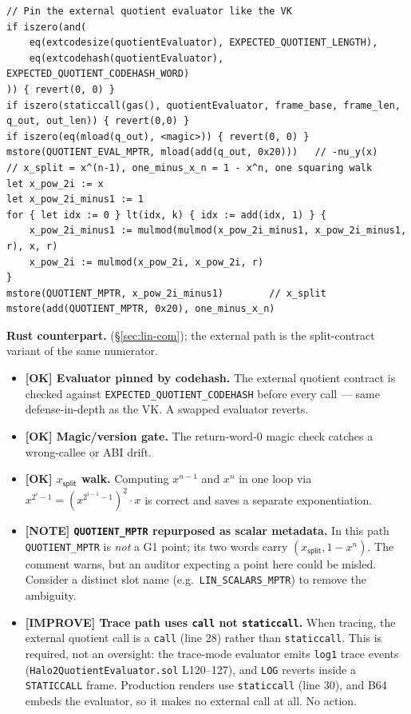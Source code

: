 \begin{lstlisting}[style=yul]
// Pin the external quotient evaluator like the VK
if iszero(and(
    eq(extcodesize(quotientEvaluator), EXPECTED_QUOTIENT_LENGTH),
    eq(extcodehash(quotientEvaluator), EXPECTED_QUOTIENT_CODEHASH_WORD)
)) { revert(0, 0) }
if iszero(staticcall(gas(), quotientEvaluator, frame_base, frame_len, q_out, out_len)) { revert(0,0) }
if iszero(eq(mload(q_out), <magic>)) { revert(0, 0) }
mstore(QUOTIENT_EVAL_MPTR, mload(add(q_out, 0x20)))   // -nu_y(x)
// x_split = x^(n-1), one_minus_x_n = 1 - x^n, one squaring walk
let x_pow_2i := x
let x_pow_2i_minus1 := 1
for { let idx := 0 } lt(idx, k) { idx := add(idx, 1) } {
    x_pow_2i_minus1 := mulmod(mulmod(x_pow_2i_minus1, x_pow_2i_minus1, r), x, r)
    x_pow_2i := mulmod(x_pow_2i, x_pow_2i, r)
}
mstore(QUOTIENT_MPTR, x_pow_2i_minus1)        // x_split
mstore(add(QUOTIENT_MPTR, 0x20), one_minus_x_n)
\end{lstlisting}

\textbf{Rust counterpart.} 
(\S\ref{sec:lin-com}); the external path is the split-contract variant
of the same numerator.

\begin{itemize}
  \item \textcolor{tracegreen}{\textbf{[OK] Evaluator pinned by
        codehash.}} The external quotient contract is checked against
        \texttt{EXPECTED\_\allowbreak{}QUOTIENT\_\allowbreak{}CODEHASH} before every call ---
        same defense-in-depth as the VK. A swapped evaluator reverts.
  \item \textcolor{tracegreen}{\textbf{[OK] Magic/version gate.}} The
        return-word-0 magic check catches a wrong-callee or ABI drift.
  \item \textcolor{tracegreen}{\textbf{[OK] $x_{\mathsf{split}}$ walk.}}
        Computing $x^{n-1}$ and $x^n$ in one loop via
        $x^{2^i-1}=(x^{2^{i-1}-1})^2\cdot x$ is correct and saves a
        separate exponentiation.
  \item \textcolor{mathpurple}{\textbf{[NOTE] \texttt{QUOTIENT\_MPTR}
        repurposed as scalar metadata.}} In this path
        \texttt{QUOTIENT\_MPTR} is \emph{not} a G1 point; its two words
        carry $(x_{\mathsf{split}}, 1-x^n)$. The comment warns, but an
        auditor expecting a point here could be misled. Consider a
        distinct slot name (e.g.\ \texttt{LIN\_\allowbreak{}SCALARS\_\allowbreak{}MPTR}) to remove
        the ambiguity.
  \item \textcolor{codegenblue}{\textbf{[IMPROVE] Trace path uses
        \texttt{call} not \texttt{staticcall}.}} When tracing, the
        external quotient call is a \texttt{call} (line 28) rather than
        \texttt{staticcall}.  This is required, not
        an oversight: the trace-mode evaluator emits \texttt{log1}
        trace events (\texttt{Halo2QuotientEvaluator.sol} L120--127),
        and \texttt{LOG} reverts inside a \texttt{STATICCALL} frame.
        Production renders use \texttt{staticcall} (line 30), and B64
        embeds the evaluator, so it makes no external call at all. No
        action.
\end{itemize}

